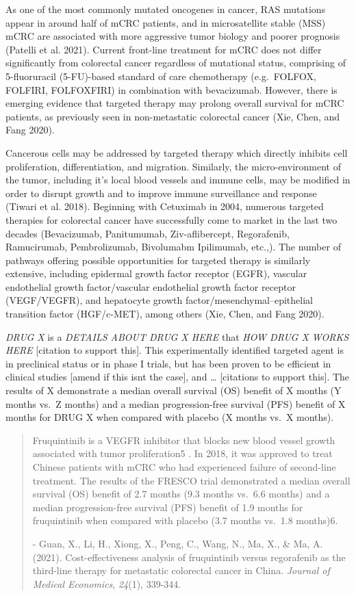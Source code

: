 \documentclass[
]{article}
\begin{document}
As one of the most commonly mutated oncogenes in cancer, RAS mutations
appear in around half of mCRC patients, and in microsatellite stable
(MSS) mCRC are associated with more aggressive tumor biology and poorer
prognosis (Patelli et al. 2021). Current front-line treatment for mCRC
does not differ significantly from colorectal cancer regardless of
mutational status, comprising of 5-fluoruracil (5-FU)-based standard of
care chemotherapy (e.g.~FOLFOX, FOLFIRI, FOLFOXFIRI) in combination with
bevacizumab. However, there is emerging evidence that targeted therapy
may prolong overall survival for mCRC patients, as previously seen in
non-metastatic colorectal cancer (Xie, Chen, and Fang 2020).

Cancerous cells may be addressed by targeted therapy which directly
inhibits cell proliferation, differentiation, and migration. Similarly,
the micro-environment of the tumor, including it's local blood vessels
and immune cells, may be modified in order to disrupt growth and to
improve immune surveillance and response (Tiwari et al. 2018). Beginning
with Cetuximab in 2004, numerous targeted therapies for colorectal
cancer have successfully come to market in the last two decades
(Bevacizumab, Panitumumab, Ziv-aflibercept, Regorafenib, Ramucirumab,
Pembrolizumab, Bivolumabm Ipilimumab, etc.,). The number of pathways
offering possible opportunities for targeted therapy is similarly
extensive, including epidermal growth factor receptor (EGFR), vascular
endothelial growth factor/vascular endothelial growth factor receptor
(VEGF/VEGFR), and hepatocyte growth factor/mesenchymal--epithelial
transition factor (HGF/c-MET), among others (Xie, Chen, and Fang 2020).

\emph{DRUG X} is a \emph{DETAILS ABOUT DRUG X HERE} that \emph{HOW DRUG
X WORKS HERE} {[}citation to support this{]}. This experimentally
identified targeted agent is in preclinical status or in phase I trials,
but has been proven to be efficient in clinical studies {[}amend if this
isnt the case{]}, and \ldots{} {[}citations to support this{]}. The
results of X demonstrate a median overall survival (OS) benefit of X
months (Y months vs.~Z months) and a median progression-free survival
(PFS) benefit of X months for DRUG X when compared with placebo (X
months vs.~X months).

\begin{quote}
Fruquintinib is a VEGFR inhibitor that blocks new blood vessel growth
associated with tumor proliferation5 . In 2018, it was approved to treat
Chinese patients with mCRC who had experienced failure of second-line
treatment. The results of the FRESCO trial demonstrated a median overall
survival (OS) benefit of 2.7 months (9.3 months vs.~6.6 months) and a
median progression-free survival (PFS) benefit of 1.9 months for
fruquintinib when compared with placebo (3.7 months vs.~1.8 months)6.

- Guan, X., Li, H., Xiong, X., Peng, C., Wang, N., Ma, X., \& Ma, A.
(2021). Cost-effectiveness analysis of fruquintinib versus regorafenib
as the third-line therapy for metastatic colorectal cancer in China.
\emph{Journal of Medical Economics}, \emph{24}(1), 339-344.
\end{quote}
\end{document}
